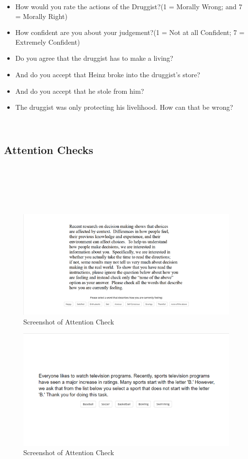 \documentclass[
  man,floatsintext]{apa6}
\providecommand{\tightlist}{%
  \setlength{\itemsep}{0pt}\setlength{\parskip}{0pt}}
\begin{document}
\begin{itemize}
\tightlist
\item
  How would you rate the actions of the Druggist?(1 = Morally Wrong; and 7 = Morally Right)
\item
  How confident are you about your judgement?(1 = Not at all Confident; 7 = Extremely Confident)
\item
  Do you agree that the druggist has to make a living?
\item
  And do you accept that Heinz broke into the druggist's store?
\item
  And do you accept that he stole from him?
\item
  The druggist was only protecting his livelihood. How can that be wrong?
\end{itemize}

~

\newpage

\hypertarget{attention-checks}{%
\subsection{Attention Checks}\label{attention-checks}}

~

~

~

\begin{figure}
\centering
\includegraphics[width=6.25in,height=\textheight]{../resources/images/attention1a.png}
\caption{Screenshot of Attention Check}
\end{figure}

\begin{figure}
\centering
\includegraphics[width=5.20833in,height=\textheight]{../resources/images/attention2a.png}
\caption{Screenshot of Attention Check}
\end{figure}
\end{document}
